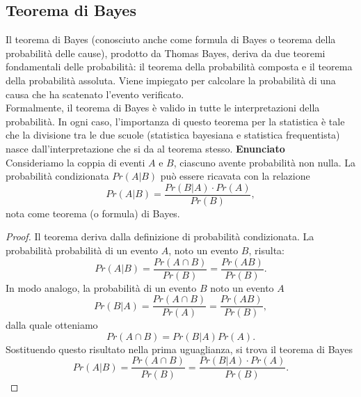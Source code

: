 \documentclass[12pt,oneside,openany]{memoir}
\numberwithin{equation}{subsection}
\begin{document}
\subsection{Teorema di Bayes}
Il teorema di Bayes (conosciuto anche come formula di Bayes o teorema della
probabilit\`a delle cause), prodotto da Thomas Bayes, deriva da due teoremi
fondamentali delle probabilit\`a: il teorema della probabilit\`a composta e il
teorema della probabilit\`a assoluta. Viene impiegato per calcolare la
probabilit\`a di una causa che ha scatenato l'evento verificato.\\
Formalmente, il teorema di Bayes \`e valido in tutte le interpretazioni della
probabilit\`a. In ogni caso, l'importanza di questo teorema per la statistica
\`e tale che la divisione tra le due scuole (statistica bayesiana e statistica
frequentista) nasce dall'interpretazione che si da al teorema stesso.
\bigbreak\noindent
\textbf{Enunciato}\\
Consideriamo la coppia di eventi $A$ e $B$, ciascuno avente probabilit\`a non
nulla. La probabilit\`a condizionata $Pr(A | B)$ pu\`o essere ricavata con la
relazione
\begin{equation}
    Pr(A | B) = \frac{Pr(B | A) \cdot Pr(A)}{Pr(B)},
\end{equation}
nota come teorema (o formula) di Bayes.
\begin{proof}
Il teorema deriva dalla definizione di probabilit\`a condizionata. La
probabilit\`a probabilit\`a di un evento $A$, noto un evento $B$, risulta:
\[
    Pr(A | B) = \frac{Pr(A \cap B)}{Pr(B)} = \frac{Pr(AB)}{Pr(B)}.
\]
In modo analogo, la probabilit\`a di un evento $B$ noto un evento $A$
\[
    Pr(B | A) = \frac{Pr(A \cap B)}{Pr(A)} = \frac{Pr(AB)}{Pr(B)},
\]
dalla quale otteniamo
\[
    Pr(A \cap B) = Pr(B | A) Pr(A).
\]
Sostituendo questo risultato nella prima uguaglianza, si trova il teorema di
Bayes
\[
    Pr(A | B) = \frac{Pr(A \cap B)}{Pr(B)} = \frac{Pr(B | A) \cdot
    Pr(A)}{Pr(B)}.
\]
\end{proof}

\end{document}
